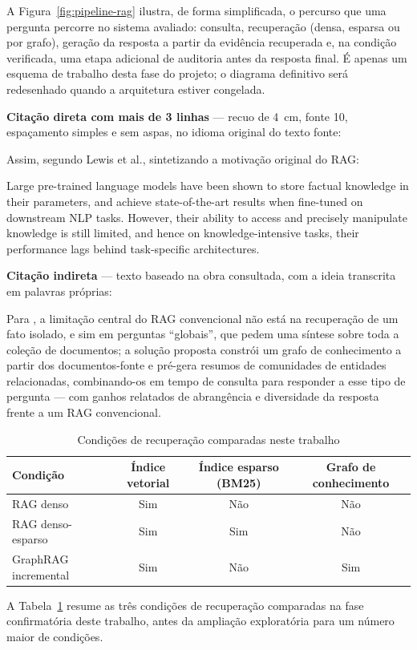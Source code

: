 A Figura~\ref{fig:pipeline-rag} ilustra, de forma simplificada, o percurso que
uma pergunta percorre no sistema avaliado: consulta, recuperação (densa,
esparsa ou por grafo), geração da resposta a partir da evidência recuperada
e, na condição verificada, uma etapa adicional de auditoria antes da resposta
final. É apenas um esquema de trabalho desta fase do projeto; o diagrama
definitivo será redesenhado quando a arquitetura estiver congelada.

\textbf{Citação direta com mais de 3 linhas} --- recuo de 4~cm, fonte 10,
espaçamento simples e sem aspas, no idioma original do texto fonte:

Assim, segundo Lewis et al., sintetizando a motivação original do RAG:

\begin{citacao}
Large pre-trained language models have been shown to store factual knowledge
in their parameters, and achieve state-of-the-art results when fine-tuned on
downstream NLP tasks. However, their ability to access and precisely
manipulate knowledge is still limited, and hence on knowledge-intensive
tasks, their performance lags behind task-specific architectures.
\parencite{lewis2020}
\end{citacao}

\textbf{Citação indireta} --- texto baseado na obra consultada, com a ideia
transcrita em palavras próprias:

Para , a limitação central do RAG convencional não está
na recuperação de um fato isolado, e sim em perguntas ``globais'', que pedem
uma síntese sobre toda a coleção de documentos; a solução proposta constrói
um grafo de conhecimento a partir dos documentos-fonte e pré-gera resumos de
comunidades de entidades relacionadas, combinando-os em tempo de consulta
para responder a esse tipo de pergunta --- com ganhos relatados de
abrangência e diversidade da resposta frente a um RAG convencional.

\begin{table}[htb]
  \caption{Condições de recuperação comparadas neste trabalho}
  \label{tab:condicoes-recuperacao}
  \centering
  \begin{tabular}{lccc}
    \toprule
    \textbf{Condição} & \textbf{Índice vetorial} & \textbf{Índice esparso (BM25)} & \textbf{Grafo de conhecimento} \\
    \midrule
    RAG denso          & Sim & Não & Não \\
    RAG denso-esparso   & Sim & Sim & Não \\
    GraphRAG incremental & Sim & Não & Sim \\
    \bottomrule
  \end{tabular}
\end{table}

A Tabela~\ref{tab:condicoes-recuperacao} resume as três condições de
recuperação comparadas na fase confirmatória deste trabalho, antes da
ampliação exploratória para um número maior de condições.
